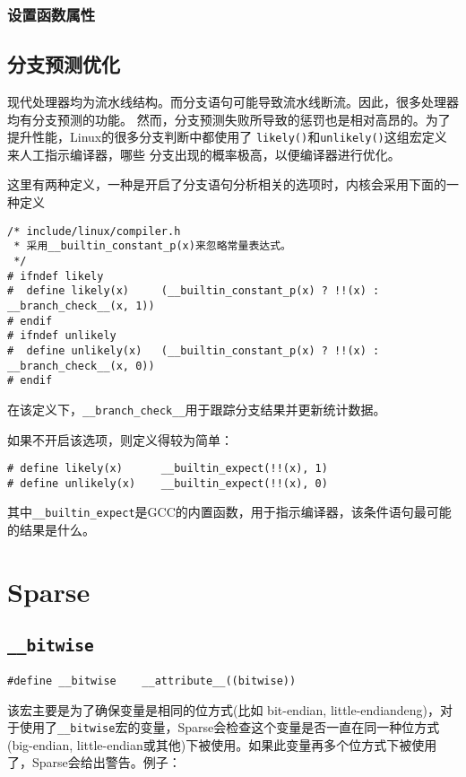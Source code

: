 			\subsubsection{设置函数属性}
	\subsection{分支预测优化}

		现代处理器均为流水线结构。而分支语句可能导致流水线断流。因此，很多处理器均有分支预测的功能。
然而，分支预测失败所导致的惩罚也是相对高昂的。为了提升性能，Linux的很多分支判断中都使用了
\texttt{likely()}和\texttt{unlikely()}这组宏定义来人工指示编译器，哪些
分支出现的概率极高，以便编译器进行优化。

		这里有两种定义，一种是开启了分支语句分析相关的选项时，内核会采用下面的一种定义
\begin{verbatim}
/* include/linux/compiler.h
 * 采用__builtin_constant_p(x)来忽略常量表达式。
 */
# ifndef likely
#  define likely(x)     (__builtin_constant_p(x) ? !!(x) : __branch_check__(x, 1))
# endif
# ifndef unlikely
#  define unlikely(x)   (__builtin_constant_p(x) ? !!(x) : __branch_check__(x, 0))
# endif
\end{verbatim}

		在该定义下，\texttt{__branch_check__}用于跟踪分支结果并更新统计数据。

		如果不开启该选项，则定义得较为简单：
\begin{verbatim}
# define likely(x)      __builtin_expect(!!(x), 1)
# define unlikely(x)    __builtin_expect(!!(x), 0)
\end{verbatim}
其中\texttt{__builtin_expect}是GCC的内置函数，用于指示编译器，该条件语句最可能的结果是什么。

	\section{Sparse}

		\subsection{\texttt{__bitwise}}
\begin{verbatim}
#define __bitwise    __attribute__((bitwise))     
\end{verbatim}
		
		该宏主要是为了确保变量是相同的位方式(比如 bit-endian, little-endiandeng)，对于使用了\texttt{__bitwise}宏的变量，Sparse会检查这个变量是否一直在同一种位方式(big-endian, little-endian或其他)下被使用。如果此变量再多个位方式下被使用了，Sparse会给出警告。例子：


